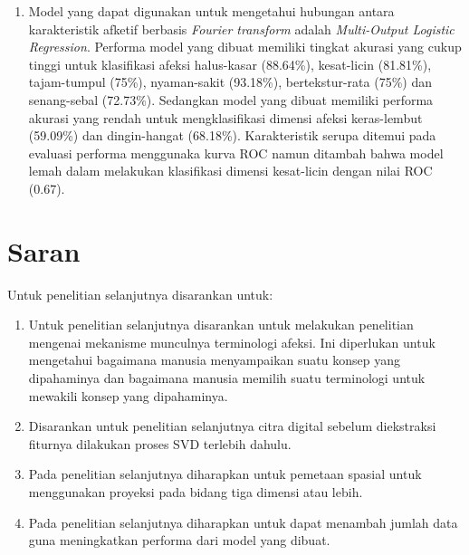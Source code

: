 \documentclass{Jurnal_kolo}
\begin{document}
\begin{multicols}{2}
\begin{enumerate}
		\item Model yang dapat digunakan untuk mengetahui hubungan antara karakteristik afketif berbasis \emph{Fourier transform} adalah \emph{Multi-Output Logistic Regression}. Performa model yang dibuat memiliki tingkat akurasi yang cukup tinggi untuk klasifikasi afeksi halus-kasar (88.64\%), kesat-licin (81.81\%), tajam-tumpul (75\%), nyaman-sakit (93.18\%), bertekstur-rata (75\%) dan senang-sebal (72.73\%). Sedangkan model yang dibuat memiliki performa akurasi yang rendah untuk mengklasifikasi dimensi afeksi keras-lembut (59.09\%) dan dingin-hangat (68.18\%). Karakteristik serupa ditemui pada evaluasi performa menggunaka kurva ROC namun ditambah bahwa model lemah dalam melakukan klasifikasi dimensi kesat-licin dengan nilai ROC (0.67).
	\end{enumerate}
	
	\section{Saran}
	\indent Untuk penelitian selanjutnya disarankan untuk: 
	\begin{enumerate}
		\item Untuk penelitian selanjutnya disarankan untuk melakukan penelitian mengenai mekanisme munculnya terminologi afeksi. Ini diperlukan untuk mengetahui bagaimana manusia menyampaikan suatu konsep yang dipahaminya dan bagaimana manusia memilih suatu terminologi untuk mewakili konsep yang dipahaminya.    
		\item Disarankan untuk penelitian selanjutnya citra digital sebelum diekstraksi fiturnya dilakukan proses SVD terlebih dahulu. 
		\item Pada penelitian selanjutnya diharapkan untuk pemetaan spasial untuk menggunakan proyeksi pada bidang tiga dimensi atau lebih. 
		\item Pada penelitian selanjutnya diharapkan untuk dapat menambah jumlah data guna meningkatkan performa dari model yang dibuat.
	\end{enumerate}
	
	
\end{multicols}
\end{document}
